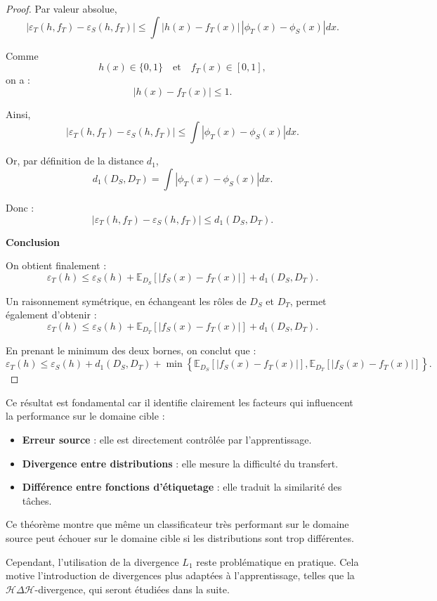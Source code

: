 \documentclass[a4paper,12pt]{article}
\theoremstyle{definition}
\theoremstyle{remark}
\begin{document}
\begin{proof}
Par valeur absolue,
\[
|\varepsilon_T(h,f_T)-\varepsilon_S(h,f_T)|
\leq
\int
|h(x)-f_T(x)|
\, |\phi_T(x)-\phi_S(x)|
dx.
\]

Comme
\[
h(x)\in\{0,1\}
\quad \text{et} \quad
f_T(x)\in[0,1],
\]
on a :
\[
|h(x)-f_T(x)|\leq 1.
\]

Ainsi,
\[
|\varepsilon_T(h,f_T)-\varepsilon_S(h,f_T)|
\leq
\int
|\phi_T(x)-\phi_S(x)|
dx.
\]

Or, par définition de la distance $d_1$,
\[
d_1(D_S,D_T)
=
\int
|\phi_T(x)-\phi_S(x)|
dx.
\]

Donc :
\[
|\varepsilon_T(h,f_T)-\varepsilon_S(h,f_T)|
\leq
d_1(D_S,D_T).
\]

\medskip

\textbf{Conclusion}

On obtient finalement :
\[
\varepsilon_T(h)
\leq
\varepsilon_S(h)
+
\mathbb{E}_{D_S}[|f_S(x)-f_T(x)|]
+
d_1(D_S,D_T).
\]

Un raisonnement symétrique, en échangeant les rôles de
$D_S$ et $D_T$, permet également d’obtenir :
\[
\varepsilon_T(h)
\leq
\varepsilon_S(h)
+
\mathbb{E}_{D_T}[|f_S(x)-f_T(x)|]
+
d_1(D_S,D_T).
\]

En prenant le minimum des deux bornes, on conclut que :
\[
\varepsilon_T(h)
\leq
\varepsilon_S(h)
+
d_1(D_S,D_T)
+
\min
\left\{
\mathbb{E}_{D_S}[|f_S(x)-f_T(x)|],
\mathbb{E}_{D_T}[|f_S(x)-f_T(x)|]
\right\}.
\]
\end{proof}




Ce résultat est fondamental car il identifie clairement les facteurs qui influencent la performance sur le domaine cible :

\begin{itemize}
\item \textbf{Erreur source} : elle est directement contrôlée par l’apprentissage.
\item \textbf{Divergence entre distributions} : elle mesure la difficulté du transfert.
\item \textbf{Différence entre fonctions d’étiquetage} : elle traduit la similarité des tâches.
\end{itemize}

Ce théorème montre que même un classificateur très performant sur le domaine source peut échouer sur le domaine cible si les distributions sont trop différentes.

Cependant, l’utilisation de la divergence $L_1$ reste problématique en pratique. Cela motive l’introduction de divergences plus adaptées à l’apprentissage, telles que la $\mathcal{H}\Delta\mathcal{H}$-divergence, qui seront étudiées dans la suite.\\
\end{document}
